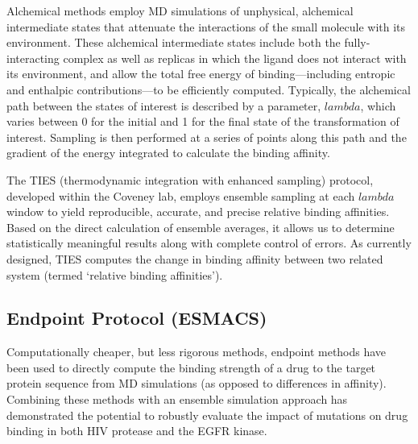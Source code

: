 \documentclass[conference]{IEEEtran}
\begin{document}
Alchemical methods employ MD simulations of unphysical, alchemical intermediate states that attenuate the interactions of the small molecule with its environment. These alchemical intermediate states include both the fully-interacting complex as well as replicas in which the ligand does not interact with its environment, and allow the total free energy of binding—including entropic and enthalpic contributions—to be efficiently computed. Typically, the alchemical path between the states of interest is described by a parameter, $lambda$, which varies between 0 for the initial and 1 for the final state of the transformation of interest. Sampling is then performed at a series of points along this path and the gradient of the energy integrated to calculate the binding affinity.

The TIES (thermodynamic integration with enhanced sampling) protocol, developed within the Coveney lab, employs ensemble sampling at each $lambda$ window to yield reproducible, accurate, and precise relative binding affinities. \cite{Bhati2017, Wan2017brd4} Based on the direct calculation of ensemble averages, it allows us to determine statistically meaningful results along with complete control of errors. As currently designed, TIES computes the change in binding affinity between two related system (termed ‘relative binding affinities’).


\subsection{Endpoint Protocol (ESMACS)}\label{sec:esmacs}

Computationally cheaper, but less rigorous methods, endpoint methods have been used to directly compute the binding strength of a drug to the target protein sequence from MD simulations (as opposed to differences in affinity). Combining these methods with an ensemble simulation approach has demonstrated the potential to robustly evaluate the impact of mutations on drug binding in both HIV protease \cite{Sadiq2010, Wright2014} and the EGFR kinase. \cite{Wan2011}     
\end{document}

